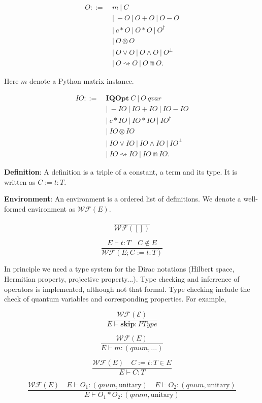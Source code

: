 \documentclass{article}
\begin{document}
$$
\begin{aligned}
    O ::=\ & m\ |\ C\ \\
        & |\ - O\ |\ O + O\ |\ O - O\\
        & |\ c * O\ |\ O * O\ |\ O^\dagger \\
        & |\ O \otimes O\ \\
        & |\ O \vee O\ |\ O \wedge O\ |\ O ^\perp \\
        & |\ O \rightsquigarrow O\ |\ O \Cap O.
\end{aligned}
$$

Here $m$ denote a Python matrix instance.

$$
\begin{aligned}
    IO ::=\ &\textbf{IQOpt}\ C\ |\ O\ qvar \\
        & |\ - IO\ |\ IO + IO\ |\ IO - IO\\
        & |\ c * IO\ |\ IO * IO\ |\ IO^\dagger \\
        & |\ IO \otimes IO\ \\
        & |\ IO \vee IO\ |\ IO \wedge IO\ |\ IO ^\perp \\
        & |\ IO \rightsquigarrow IO\ |\ IO \Cap IO.
\end{aligned}
$$

\textbf{Definition}: A definition is a triple of a constant, a term and its type. It is written as $C := t : T$.

\textbf{Environment}: An environment is a ordered list of definitions. We denote a well-formed environment as $\mathcal{WF}(E)$.

$$
\frac{}{\mathcal{WF}([])}
$$

$$
\frac{E \vdash t : T\quad C \notin E}{\mathcal{WF}(E; C := t : T)}
$$



In principle we need a type system for the Dirac notations (Hilbert space, Hermitian property, projective property...).
Type checking and inferrence of operators is implemented, although not that formal. Type checking include the check of quantum variables and corresponding properties.
For example,

$$
\frac{\mathcal{WF(E)}}{E \vdash \mathbf{skip} : PType}
$$

$$
\frac{\mathcal{WF}(E)}{E \vdash m : (qnum, ...)}
$$

$$
\frac{\mathcal{WF}(E)\quad C:=t:T \in E}{E \vdash C : T}
$$

$$
\frac{\mathcal{WF}(E)\quad E \vdash O_1 : (qnum, \text{unitary}) \quad E \vdash O_2 : (qnum, \text{unitary})}{E \vdash O_1 * O_2 : (qnum, \text{unitary})}
$$
\end{document}
